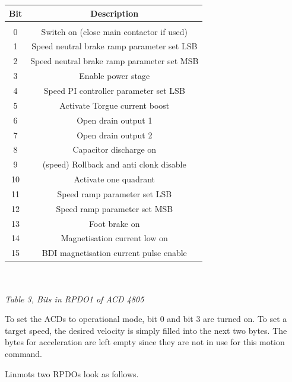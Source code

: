 \begin{tabular}{|c|c|}
	\hline 
	Bit & Description \\ 
	\hline 
	&   \\ 
	\hline 
	0 &  Switch on (close main contactor if used)\\ 
	\hline 
	1 & Speed neutral brake ramp parameter set LSB\\ 
	\hline 
	2 & Speed neutral brake ramp parameter set MSB\\ 
	\hline 
	3 & Enable power stage\\ 
	\hline 
	4 & Speed PI controller parameter set LSB\\
	\hline
	5 & Activate Torgue current boost\\
	\hline
	6 & Open drain output 1\\
	\hline
	7 & Open drain output 2\\
	\hline
	8 & Capacitor discharge on\\
	\hline
	9 & (speed) Rollback and anti clonk disable\\
	\hline
	10 & Activate one quadrant\\
	\hline
	11 & Speed ramp parameter set LSB\\
	\hline
	12 & Speed ramp parameter set MSB\\
	\hline
	13 & Foot brake on\\ 
	\hline
	14 & Magnetisation current low on\\
	\hline
	15 & BDI magnetisation current pulse enable\\
	\hline
\end{tabular} 
\\
\\
\textit{Table 3, Bits in RPDO1 of ACD 4805}

To set the ACDs to operational mode, bit 0 and bit 3 are turned on. To set a target speed, the desired velocity is simply filled into the next two bytes. The bytes for acceleration are left empty since they are not in use for this motion command. 

Linmots two RPDOs look as follows.

